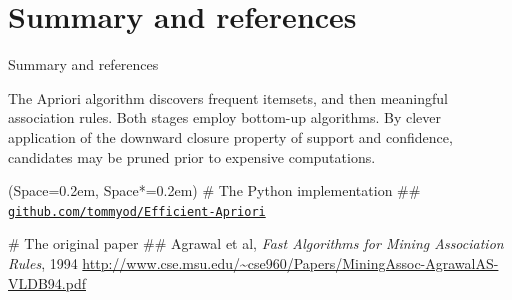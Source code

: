 \documentclass[12pt, aspectratio=1610]{beamer}
\newcommand{\listSpace}{0.2em}
\theoremstyle{plain}
\begin{document}
\section{Summary and references}
\begin{frame}[fragile]{Summary and references}
	
	The Apriori algorithm discovers frequent itemsets, and then meaningful association rules.
	Both stages employ bottom-up algorithms.
	By clever application of the downward closure property of support and confidence, candidates may be pruned prior to expensive computations.
	
	\vfill
	
	\begin{easylist}[itemize]
		\ListProperties(Space=\listSpace, Space*=\listSpace)
		# The Python implementation ##
		 \href{https://github.com/tommyod/Efficient-Apriori/}{\texttt{github.com/tommyod/Efficient-Apriori}}
		
		# The original paper
		## Agrawal et al, \emph{Fast Algorithms for Mining Association Rules}, 1994  \url{http://www.cse.msu.edu/~cse960/Papers/MiningAssoc-AgrawalAS-VLDB94.pdf}
		
	\end{easylist}
\end{frame}
\end{document}
